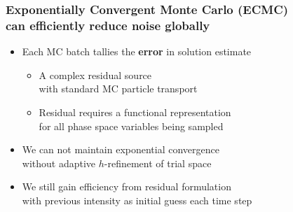 \documentclass[xcolor=dvipsnames,hyperref={pdfpagelabels=false},unknownkeysallowed]{beamer}
\newcommand{\colb}[1]{{\color{blue} #1}}
\newcommand{\colG}[1]{{\color{Gray!110} #1}}
\newcommand{\colr}[1]{{\color{red} #1}}
\newlength{\wideitemsep}
\let\olditem\item
\renewcommand{\item}{\setlength{\itemsep}{\wideitemsep}\olditem}
\begin{document}
{\addtolength\leftmargini{-0.165in}
\begin{frame}
    \frametitle{Exponentially Convergent Monte Carlo (ECMC) \\ can efficiently reduce noise globally}
    \begin{itemize}
            \addtolength{\wideitemsep}{0.14in}
        \item[] Each MC batch tallies the \textbf{error} in solution estimate
            \begin{itemize}
                \item A \colr{complex} residual source \\ \colG{with standard MC particle transport}
                    \vspace{-0.21in}
                \item {Residual requires  a \colr{functional} representation} \\ \colG{for all phase space variables being sampled}
    \end{itemize}
    \vspace{-0.1in}
        \item[] We can not maintain exponential convergence \\
       \colG{without adaptive $h$-refinement of trial space}    
        \item[] We still gain efficiency from \colb{residual formulation} \\ with previous intensity as initial guess each time step
     \end{itemize}
 \end{frame}
 }
\end{document}
